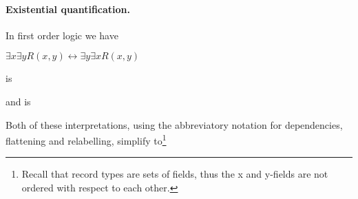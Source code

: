 \paragraph{Existential quantification.}  In first order logic we have
\begin{display}
$\exists x \exists y R(x,y) \leftrightarrow \exists y
\exists x R(x,y)$
\end{display}
 is
\begin{display}
\end{display}
and  is
\begin{display}
\end{display}
Both of these interpretations, using the abbreviatory notation for
dependencies, flattening and relabelling, simplify to\footnote{Recall
  that record types are sets of fields, thus the x and y-fields are
  not ordered with respect to each other.} 
\begin{display}
\end{display}


